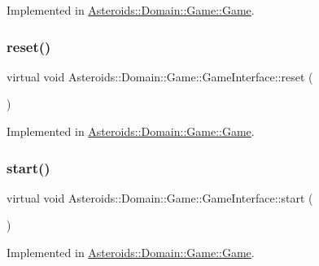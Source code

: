 Implemented in \hyperlink{classAsteroids_1_1Domain_1_1Game_1_1Game_a7e1bbc8f577a798f57d736bdc51fd149}{Asteroids\+::\+Domain\+::\+Game\+::\+Game}.

\mbox{\label{classAsteroids_1_1Domain_1_1Game_1_1GameInterface_ae68b2eaf69d331bd9f90d3297328cc40}} 
\subsubsection{\texorpdfstring{reset()}{reset()}}
{\footnotesize\ttfamily virtual void Asteroids\+::\+Domain\+::\+Game\+::\+Game\+Interface\+::reset (\begin{DoxyParamCaption}{ }\end{DoxyParamCaption})\hspace{0.3cm}{\ttfamily [pure virtual]}}



Implemented in \hyperlink{classAsteroids_1_1Domain_1_1Game_1_1Game_a61e639ba44b16737fdfe26887dba965f}{Asteroids\+::\+Domain\+::\+Game\+::\+Game}.

\mbox{\label{classAsteroids_1_1Domain_1_1Game_1_1GameInterface_a9e11cc0884f1865033627d80e3c4078d}} 
\subsubsection{\texorpdfstring{start()}{start()}}
{\footnotesize\ttfamily virtual void Asteroids\+::\+Domain\+::\+Game\+::\+Game\+Interface\+::start (\begin{DoxyParamCaption}{ }\end{DoxyParamCaption})\hspace{0.3cm}{\ttfamily [pure virtual]}}



Implemented in \hyperlink{classAsteroids_1_1Domain_1_1Game_1_1Game_a824018131c10d49c8addd305ff36209b}{Asteroids\+::\+Domain\+::\+Game\+::\+Game}.

